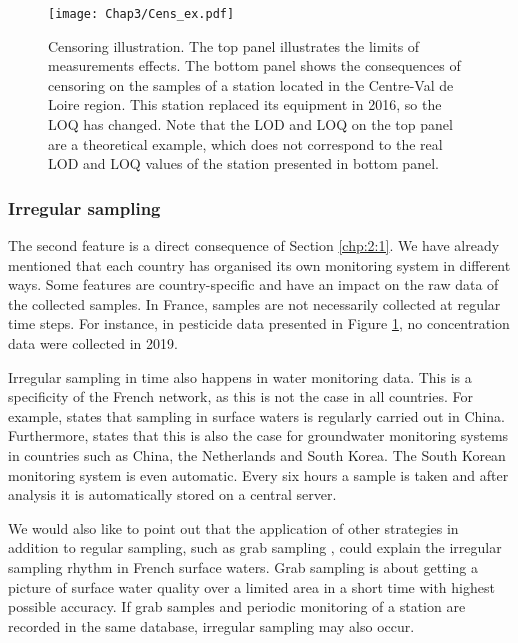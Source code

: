 \begin{figure}
    \centering
    \texttt{[image: Chap3/Cens\_ex.pdf]}
    \caption{Censoring illustration. The top panel illustrates the limits of measurements effects. The bottom panel shows the consequences of censoring on the samples of a station located in the Centre-Val de Loire region. This station replaced its equipment in 2016, so the LOQ has changed. Note that the LOD and LOQ on the top panel are a theoretical example, which does not correspond to the real LOD and LOQ values of the station presented in bottom panel.}
    \label{fig:cens_ex}
\end{figure}

\subsubsection{Irregular sampling}


The second feature is a direct consequence of Section \ref{chp:2:1}. We have already mentioned that each country has organised its own monitoring system in different ways. Some features are country-specific and have an impact on the raw data of the collected samples. In France, samples are not necessarily collected at regular time steps. For instance, in pesticide data presented in Figure \ref{fig:cens_ex}, no concentration data were collected in 2019. 

Irregular sampling in time also happens in water monitoring data. This is a specificity of the French network, as this is not the case in all countries. For example, \cite{Zhang2008} states that sampling in surface waters is regularly carried out in China. Furthermore, \cite{Joergensen2008} states that this is also the case for groundwater monitoring systems in countries such as China, the Netherlands and South Korea. The South Korean monitoring system is even automatic. Every six hours a sample is taken and after analysis it is automatically stored on a central server. 

We would also like to point out that the application of other strategies in addition to regular sampling, such as grab sampling \citep{Novic2017}, could explain the irregular sampling rhythm in French surface waters. Grab sampling is about getting a picture of surface water quality over a limited area in a short time with highest possible accuracy. If grab samples and periodic monitoring of a station are recorded in the same database, irregular sampling may also occur.

